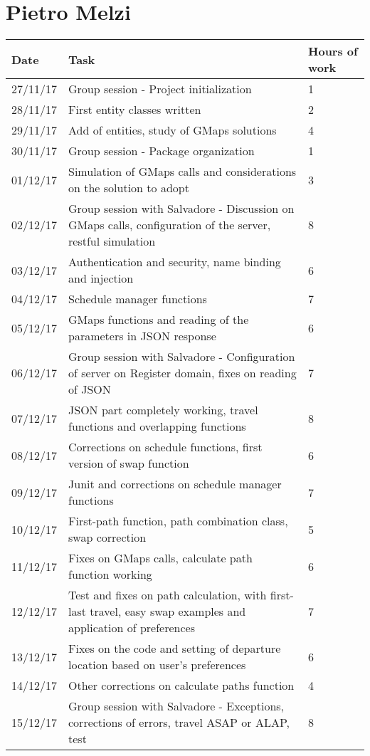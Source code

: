 \section{Pietro Melzi}

\begin{longtable}{ p{2cm} p{10cm} p{3cm}}
	Date & Task & Hours of work\\
	\hline
	27/11/17 & Group session - Project initialization & 1\\
	28/11/17 & First entity classes written & 2\\
	29/11/17 & Add of entities, study of GMaps solutions & 4\\
	30/11/17 & Group session - Package organization & 1\\
	01/12/17 & Simulation of GMaps calls and considerations on the solution to adopt & 3\\
	02/12/17 & Group session with Salvadore - Discussion on GMaps calls, configuration of the server, restful simulation & 8\\
	03/12/17 & Authentication and security, name binding and injection & 6\\
	04/12/17 & Schedule manager functions & 7\\
	05/12/17 & GMaps functions and reading of the parameters in JSON response & 6\\
	06/12/17 & Group session with Salvadore - Configuration of server on Register domain, fixes on reading of JSON & 7\\
	07/12/17 & JSON part completely working, travel functions and overlapping functions & 8\\
	08/12/17 & Corrections on schedule functions, first version of swap function & 6\\
	09/12/17 & Junit and corrections on schedule manager functions & 7\\
	10/12/17 & First-path function, path combination class, swap correction & 5\\
	11/12/17 & Fixes on GMaps calls, calculate path function working & 6\\
	12/12/17 & Test and fixes on path calculation, with first-last travel, easy swap examples and application of preferences & 7\\
	13/12/17 & Fixes on the code and setting of departure location based on user's preferences & 6\\
	14/12/17 & Other corrections on calculate paths function & 4\\
	15/12/17 & Group session with Salvadore - Exceptions, corrections of errors, travel ASAP or ALAP, test & 8\\

\end{longtable}
